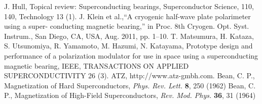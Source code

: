 \documentclass[journal]{IEEEtran}
\begin{document}
\ifCLASSOPTIONcaptionsoff
  \newpage
\fi





%
%
%
\begin{thebibliography}{99}

J. Hull, Topical review: Superconducting bearings, Superconductor Science, 110, 140, Technology 13 (1).
J. Klein et al.,“A cryogenic half-wave plate polarimeter using a super- conducting magnetic bearing,” in Proc. 8th Cryogen. Opt. Syst. Instrum., San Diego, CA, USA, Aug. 2011, pp. 1–10.
T. Matsumura, H. Kataza, S. Utsunomiya, R. Yamamoto, M. Hazumi, N. Katayama, Prototype design and performance of a polarization modulator for use in space using a superconducting magnetic bearing, IEEE, TRANSACTIONS ON APPLIED SUPERCONDUCTIVITY 26 (3).
ATZ, http://www.atz-gmbh.com.
Bean, C. P., Magnetization of Hard Superconductors, {\em Phys. Rev. Lett.\/} {\bf 8}, 250 (1962)
Bean, C. P., Magnetization of High-Field Superconductors, {\em Rev. Mod. Phys.\/} {\bf 36}, 31 (1964)
\end{thebibliography}

%
\end{document}
